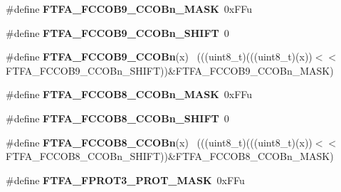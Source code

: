 \begin{DoxyCompactItemize}
\item 
\hypertarget{group___f_t_f_a___register___masks_ga3d424ebf51a8b74312c01efe408117f1}{}\#define {\bfseries F\+T\+F\+A\+\_\+\+F\+C\+C\+O\+B9\+\_\+\+C\+C\+O\+Bn\+\_\+\+M\+A\+S\+K}~0x\+F\+Fu\label{group___f_t_f_a___register___masks_ga3d424ebf51a8b74312c01efe408117f1}

\item 
\hypertarget{group___f_t_f_a___register___masks_gae44c6a3215eb5b3a75a5cdd54e570127}{}\#define {\bfseries F\+T\+F\+A\+\_\+\+F\+C\+C\+O\+B9\+\_\+\+C\+C\+O\+Bn\+\_\+\+S\+H\+I\+F\+T}~0\label{group___f_t_f_a___register___masks_gae44c6a3215eb5b3a75a5cdd54e570127}

\item 
\hypertarget{group___f_t_f_a___register___masks_ga1351353f4c60d32e9ba9f2e0ab2c3c55}{}\#define {\bfseries F\+T\+F\+A\+\_\+\+F\+C\+C\+O\+B9\+\_\+\+C\+C\+O\+Bn}(x)                                      ~(((uint8\+\_\+t)(((uint8\+\_\+t)(x))$<$$<$F\+T\+F\+A\+\_\+\+F\+C\+C\+O\+B9\+\_\+\+C\+C\+O\+Bn\+\_\+\+S\+H\+I\+F\+T))\&F\+T\+F\+A\+\_\+\+F\+C\+C\+O\+B9\+\_\+\+C\+C\+O\+Bn\+\_\+\+M\+A\+S\+K)\label{group___f_t_f_a___register___masks_ga1351353f4c60d32e9ba9f2e0ab2c3c55}

\item 
\hypertarget{group___f_t_f_a___register___masks_ga4c40268e4d4ae3bc87a782cbbfc9ec99}{}\#define {\bfseries F\+T\+F\+A\+\_\+\+F\+C\+C\+O\+B8\+\_\+\+C\+C\+O\+Bn\+\_\+\+M\+A\+S\+K}~0x\+F\+Fu\label{group___f_t_f_a___register___masks_ga4c40268e4d4ae3bc87a782cbbfc9ec99}

\item 
\hypertarget{group___f_t_f_a___register___masks_ga9603935c5e6f2c1d51b6b4e952e1428a}{}\#define {\bfseries F\+T\+F\+A\+\_\+\+F\+C\+C\+O\+B8\+\_\+\+C\+C\+O\+Bn\+\_\+\+S\+H\+I\+F\+T}~0\label{group___f_t_f_a___register___masks_ga9603935c5e6f2c1d51b6b4e952e1428a}

\item 
\hypertarget{group___f_t_f_a___register___masks_ga017610265175ee31c063f1f4cde09f63}{}\#define {\bfseries F\+T\+F\+A\+\_\+\+F\+C\+C\+O\+B8\+\_\+\+C\+C\+O\+Bn}(x)                                      ~(((uint8\+\_\+t)(((uint8\+\_\+t)(x))$<$$<$F\+T\+F\+A\+\_\+\+F\+C\+C\+O\+B8\+\_\+\+C\+C\+O\+Bn\+\_\+\+S\+H\+I\+F\+T))\&F\+T\+F\+A\+\_\+\+F\+C\+C\+O\+B8\+\_\+\+C\+C\+O\+Bn\+\_\+\+M\+A\+S\+K)\label{group___f_t_f_a___register___masks_ga017610265175ee31c063f1f4cde09f63}

\item 
\hypertarget{group___f_t_f_a___register___masks_gaa5d3fe6e00716f1d147e22799ba5b7ae}{}\#define {\bfseries F\+T\+F\+A\+\_\+\+F\+P\+R\+O\+T3\+\_\+\+P\+R\+O\+T\+\_\+\+M\+A\+S\+K}~0x\+F\+Fu\label{group___f_t_f_a___register___masks_gaa5d3fe6e00716f1d147e22799ba5b7ae}


\end{DoxyCompactItemize}
